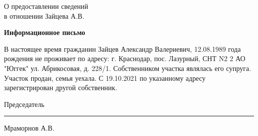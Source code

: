 \begin{flushleft}
	\vspace{10mm}
О предоставлении сведений\\
в отношении Зайцева  А.В.
\end{flushleft}
\vspace{7mm}
\begin{center}
	\Large\textbf{Информационное письмо}
\end{center}
\par

В настоящее время гражданин Зайцев Александр Валериевич, 12.08.1989 года рождения не проживает по адресу:  г. Краснодар, пос. Лазурный, СНТ N2 2 АО "Юггек" ул. Абрикосовая, д. 228/1.  Собственником участка являлась его супруга. Участок продан, семья уехала. С 19.10.2021   по указанному адресу зарегистрирован другой собственник. 

\vspace{35mm}
Председатель \hfill    \rule{4cm}{0.1 mm}    Мраморнов А.В.




